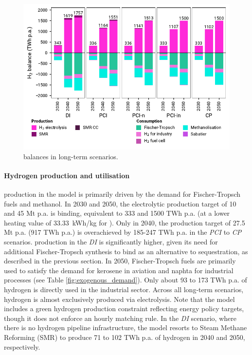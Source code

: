 \documentclass[final,5p,times,twocolumn,sort&compress]{elsarticle}
\begin{document}
\begin{figure}[htbp]
  \centering
  \includegraphics[width=\linewidth]{balances_overview_H2}
  \caption{ balances in long-term scenarios.}
  \label{fig:balances_overview_H2_stored}
\end{figure}
\paragraph{Hydrogen production and utilisation}
\label{sec:h2_production_and_utilisation}
 production in the model is primarily driven by the demand for Fischer-Tropsch fuels and methanol. In 2030 and 2050, the electrolytic  production target of 10 and 45 Mt p.a. is binding, equivalent to 333 and 1500 TWh p.a. (at a lower heating value of \SI{33.33}{kWh/kg} for ). Only in 2040, the  production target of 27.5 Mt p.a. (917 TWh p.a.) is overachieved by 185-247 TWh p.a. in the \textit{PCI} to \textit{CP} scenarios.  production in the \textit{DI} is significantly higher, given its need for additional Fischer-Tropsch synthesis to bind  as an alternative to sequestration, as described in the previous section.
In 2050, Fischer-Tropsch fuels are primarily used to satisfy the demand for kerosene in aviation and naphta for industrial processes (see Table \ref{fig:exogenous_demand}). Only about 93 to 173 TWh p.a. of hydrogen is directly used in the industrial sector. Across all long-term scenarios, hydrogen is almost exclusively produced via electrolysis. Note that the model includes a green hydrogen production constraint reflecting energy policy targets, though it does not enforce an hourly matching rule.
In the \textit{DI} scenario, where there is no hydrogen pipeline infrastructure, the model resorts to Steam Methane Reforming (SMR) to produce 71 to 102 TWh p.a. of hydrogen in 2040 and 2050, respectively.
\end{document}
